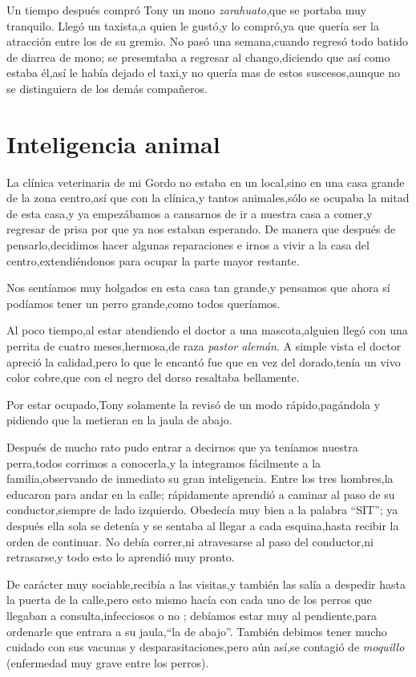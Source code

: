 \documentclass[letterpaper,12pt]{book}
\begin{document}
Un tiempo después compró Tony un mono {\it zarahuato},que se portaba muy tranquilo. Llegó un taxista,a quien le gustó,y lo compró,ya que quería ser la atracción entre los de su gremio. No pasó una semana,cuando regresó todo batido de diarrea de mono; se presemtaba a  regresar al chango,diciendo que así como estaba él,así le había dejado el taxi,y no quería mas de estos suscesos,aunque no se distinguiera de los demás compañeros.
\chapter{Inteligencia animal}
La clínica veterinaria de mi Gordo no estaba en un local,sino en una casa grande de la zona centro,así que con la clínica,y tantos animales,sólo se ocupaba la mitad de esta casa,y ya empezábamos a cansarnos de ir a nuestra casa a comer,y regresar de prisa por que ya nos estaban esperando.
De manera que después de pensarlo,decidimos hacer algunas reparaciones e irnos a vivir a la casa del centro,extendiéndonos para ocupar la parte mayor restante.

Nos sentíamos muy holgados en esta casa tan grande,y pensamos  que ahora sí podíamos tener un perro grande,como todos queríamos.

Al poco tiempo,al estar atendiendo el doctor a una mascota,alguien llegó con una perrita de cuatro meses,hermosa,de raza {\it pastor alemán}. A simple vista el doctor apreció la calidad,pero lo que le encantó fue que en vez del dorado,tenía un vivo color cobre,que con el negro del dorso resaltaba bellamente.

Por estar ocupado,Tony solamente la revisó de un modo rápido,pagándola y pidiendo que la metieran en la jaula de abajo.

Después de mucho rato pudo entrar a decirnos que ya teníamos nuestra perra,todos corrimos a conocerla,y la integramos fácilmente a la familia,observando de inmediato su gran inteligencia. Entre los tres hombres,la educaron para andar en la calle; rápidamente aprendió a caminar al paso de su conductor,siempre de lado izquierdo. Obedecía muy bien a la palabra ``SIT''; ya después ella sola se detenía y se sentaba al llegar a cada esquina,hasta recibir la orden de continuar. No debía correr,ni atravesarse al paso del conductor,ni retrasarse,y todo esto lo aprendió muy pronto. 

De carácter muy sociable,recibía a las visitas,y también las salía a despedir hasta la puerta de la calle,pero esto mismo hacía con cada uno de los perros que llegaban a consulta,infecciosos o no ; debíamos estar muy al pendiente,para ordenarle que entrara a su jaula,``la de abajo''. También debimos tener mucho cuidado con sus vacunas y desparasitaciones,pero aún así,se contagió de {\it moquillo}\/ (enfermedad muy grave entre los perros).
\end{document}
